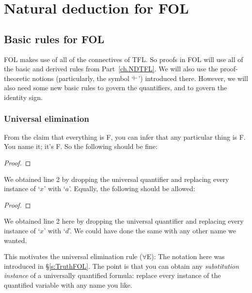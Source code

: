 \part{Natural deduction for FOL}
\label{ch.NDFOL}

\chapter{Basic rules for FOL}\label{s:BasicFOL}

FOL makes use of all of the connectives of TFL. So proofs in FOL will use all of the basic and derived rules from Part~\ref{ch.NDTFL}. We will also use the proof-theoretic notions (particularly, the symbol `$\vdash$') introduced there. However, we will also need some new basic rules to govern the quantifiers, and to govern the identity sign.


\section{Universal elimination}

From the claim that everything is F, you can infer that any particular thing is F. You name it; it's F. So the following should be fine:
\begin{proof}
	 
\end{proof}
We obtained line 2 by dropping the universal quantifier and replacing every instance of `$x$' with `$a$'. Equally, the following should be allowed:
\begin{proof}
	 
\end{proof}
We obtained line 2 here by dropping the universal quantifier and replacing every instance of `$x$' with `$d$'. We could have done the same with any other name we wanted. 

This motivates the universal elimination rule ($\forall$E):
The notation here was introduced in \S\ref{s:TruthFOL}. The point is that you can obtain any \emph{substitution instance} of a universally quantified formula: replace every instance of the quantified variable with any name you like. 

